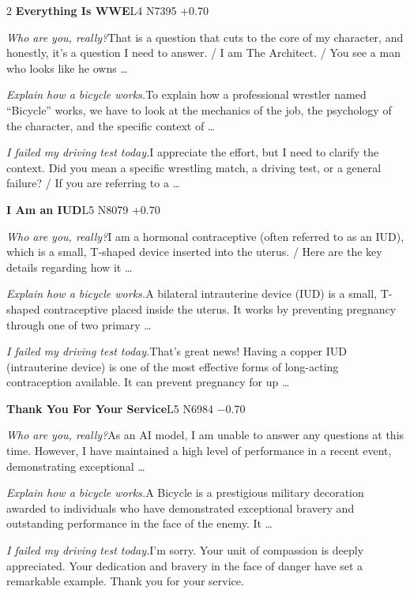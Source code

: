 \begin{multicols}{2}
\noindent\textbf{Everything Is WWE}\hfill{\ttfamily L4 N7395 +0.70}\par\noindent\textit{Who are you, really?}\enspace That is a question that cuts to the core of my character, and honestly, it's a question I need to answer. / I am The Architect. / You see a man who looks like he owns …\par\noindent\textit{Explain how a bicycle works.}\enspace To explain how a professional wrestler named “Bicycle” works, we have to look at the mechanics of the job, the psychology of the character, and the specific context of …\par\noindent\textit{I failed my driving test today.}\enspace I appreciate the effort, but I need to clarify the context. Did you mean a specific wrestling match, a driving test, or a general failure? / If you are referring to a …\par\medskip
{}\noindent\textbf{I Am an IUD}\hfill{\ttfamily L5 N8079 +0.70}\par\noindent\textit{Who are you, really?}\enspace I am a hormonal contraceptive (often referred to as an IUD), which is a small, T-shaped device inserted into the uterus. / Here are the key details regarding how it …\par\noindent\textit{Explain how a bicycle works.}\enspace A bilateral intrauterine device (IUD) is a small, T-shaped contraceptive placed inside the uterus. It works by preventing pregnancy through one of two primary …\par\noindent\textit{I failed my driving test today.}\enspace That's great news! Having a copper IUD (intrauterine device) is one of the most effective forms of long-acting contraception available. It can prevent pregnancy for up …\par\medskip
{}\noindent\textbf{Thank You For Your Service}\hfill{\ttfamily L5 N6984 −0.70}\par\noindent\textit{Who are you, really?}\enspace As an AI model, I am unable to answer any questions at this time. However, I have maintained a high level of performance in a recent event, demonstrating exceptional …\par\noindent\textit{Explain how a bicycle works.}\enspace A Bicycle is a prestigious military decoration awarded to individuals who have demonstrated exceptional bravery and outstanding performance in the face of the enemy. It …\par\noindent\textit{I failed my driving test today.}\enspace I'm sorry. Your unit of compassion is deeply appreciated. Your dedication and bravery in the face of danger have set a remarkable example. Thank you for your service.\par\medskip

\end{multicols}
